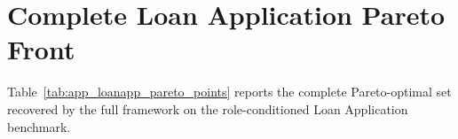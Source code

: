 %

\section{Complete Loan Application Pareto Front}
\label{app:loanapp_pareto_points}

Table~\ref{tab:app_loanapp_pareto_points} reports the complete
Pareto-optimal set recovered by the full framework on the
role-conditioned Loan Application benchmark.

